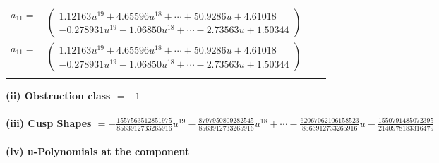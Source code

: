 \documentclass[1p]{elsarticle_modified}
\theoremstyle{definition}
\begin{document}
\begin{tabular}{m{7pt} m{180pt} m{7pt} m{180pt} }
\flushright $a_{11}=$&$\begin{pmatrix}1.12163 u^{19}+4.65596 u^{18}+\cdots+50.9286 u+4.61018\\-0.278931 u^{19}-1.06850 u^{18}+\cdots-2.73563 u+1.50344\end{pmatrix}$\\ \flushright $a_{11}=$&$\begin{pmatrix}1.12163 u^{19}+4.65596 u^{18}+\cdots+50.9286 u+4.61018\\-0.278931 u^{19}-1.06850 u^{18}+\cdots-2.73563 u+1.50344\end{pmatrix}$\\&\end{tabular}
\flushleft \textbf{(ii) Obstruction class $= -1$}\\~\\
\flushleft \textbf{(iii) Cusp Shapes $= -\frac{1557563512851975}{8563912733265916} u^{19}-\frac{8797950809282545}{8563912733265916} u^{18}+\cdots-\frac{62067062106158523}{8563912733265916} u-\frac{1550791485072395}{2140978183316479}$}\\~\\
\newpage\renewcommand{\arraystretch}{1}
\flushleft \textbf{(iv) u-Polynomials at the component}\newline \\
\end{document}
